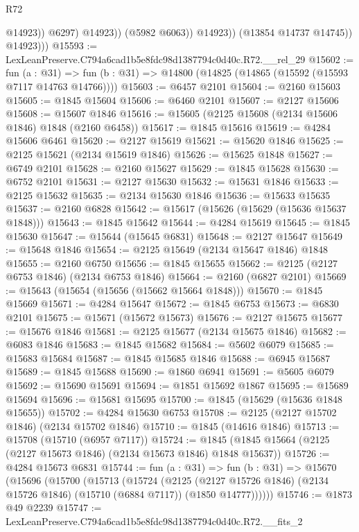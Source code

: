 \begin{lexlean}{R72}
\begin{coremodule}
                            @14923))
                        @6297)
                      @14923))
                  (@5982 @6063))
                @14923))
            (@13854 @14737 @14745))
          @14923)))
@15593 := LexLeanPreserve.C794a6cad1b5e8fdc98d1387794c0d40c.R72.__rel_29
@15602 := fun (a : @31) =>
  fun (b : @31) => @14800 (@14825 (@14865 (@15592 (@15593 @7117 @14763 @14766))))
@15603 := @6457 @2101
@15604 := @2160 @15603
@15605 := @1845 @15604
@15606 := @6460 @2101
@15607 := @2127 @15606
@15608 := @15607 @1846
@15616 := @15605 (@2125 @15608 (@2134 @15606 @1846) @1848 (@2160 @6458))
@15617 := @1845 @15616
@15619 := @4284 @15606 @6461
@15620 := @2127 @15619
@15621 := @15620 @1846
@15625 := @2125 @15621 (@2134 @15619 @1846)
@15626 := @15625 @1848
@15627 := @6749 @2101
@15628 := @2160 @15627
@15629 := @1845 @15628
@15630 := @6752 @2101
@15631 := @2127 @15630
@15632 := @15631 @1846
@15633 := @2125 @15632
@15635 := @2134 @15630 @1846
@15636 := @15633 @15635
@15637 := @2160 @6828
@15642 := @15617 (@15626 (@15629 (@15636 @15637 @1848)))
@15643 := @1845 @15642
@15644 := @4284 @15619
@15645 := @1845 @15630
@15647 := @15644 (@15645 @6831)
@15648 := @2127 @15647
@15649 := @15648 @1846
@15654 := @2125 @15649 (@2134 @15647 @1846) @1848
@15655 := @2160 @6750
@15656 := @1845 @15655
@15662 := @2125 (@2127 @6753 @1846) (@2134 @6753 @1846)
@15664 := @2160 (@6827 @2101)
@15669 := @15643 (@15654 (@15656 (@15662 @15664 @1848)))
@15670 := @1845 @15669
@15671 := @4284 @15647
@15672 := @1845 @6753
@15673 := @6830 @2101
@15675 := @15671 (@15672 @15673)
@15676 := @2127 @15675
@15677 := @15676 @1846
@15681 := @2125 @15677 (@2134 @15675 @1846)
@15682 := @6083 @1846
@15683 := @1845 @15682
@15684 := @5602 @6079
@15685 := @15683 @15684
@15687 := @1845 @15685 @1846
@15688 := @6945 @15687
@15689 := @1845 @15688
@15690 := @1860 @6941
@15691 := @5605 @6079
@15692 := @15690 @15691
@15694 := @1851 @15692 @1867
@15695 := @15689 @15694
@15696 := @15681 @15695
@15700 := @1845 (@15629 (@15636 @1848 @15655))
@15702 := @4284 @15630 @6753
@15708 := @2125 (@2127 @15702 @1846) (@2134 @15702 @1846)
@15710 := @1845 (@14616 @1846)
@15713 := @15708 (@15710 (@6957 @7117))
@15724 := @1845 (@1845 @15664 (@2125 (@2127 @15673 @1846) (@2134 @15673 @1846) @1848 @15637))
@15726 := @4284 @15673 @6831
@15744 := fun (a : @31) =>
  fun (b : @31) =>
  @15670
    (@15696
      (@15700
        (@15713
          (@15724
            (@2125
              (@2127 @15726 @1846)
              (@2134 @15726 @1846)
              (@15710 (@6884 @7117))
              (@1850 @14777))))))
@15746 := @1873 @49 @2239
@15747 := LexLeanPreserve.C794a6cad1b5e8fdc98d1387794c0d40c.R72.__fits_2

\end{coremodule}
\end{lexlean}
